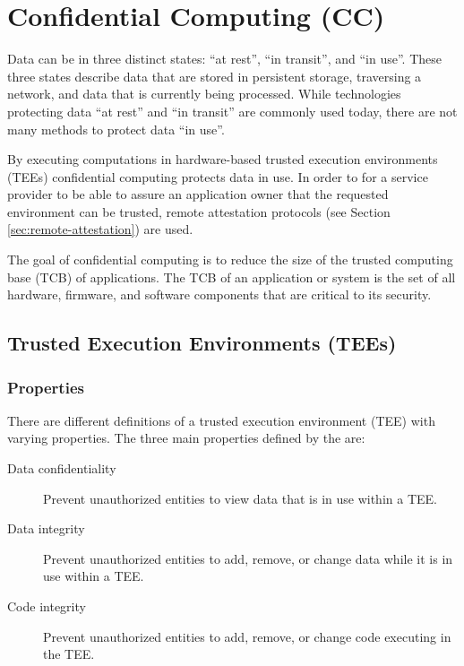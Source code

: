 \section{Confidential Computing (CC)}
\label{sec:confidential-computing}

Data can be in three distinct states: ``at rest'', ``in transit'', and ``in
use''. These three states describe data that are stored in persistent storage,
traversing a network, and data that is currently being processed. While
technologies protecting data ``at rest'' and ``in transit'' are commonly used
today, there are not many methods to protect data ``in use''.

By executing computations in hardware-based trusted execution environments
(TEEs) confidential computing protects data in use. In order to for a service
provider to be able to assure an application owner that the requested
environment can be trusted, remote attestation protocols (see Section
\ref{sec:remote-attestation}) are used.

The goal of confidential computing is to reduce the size of the trusted
computing base (TCB) of applications. The TCB of an application or system is the
set of all hardware, firmware, and software components that are critical to its
security.

\subsection{Trusted Execution Environments (TEEs)}
\label{sec:tee}

\subsubsection{Properties}

There are different definitions of a trusted execution environment (TEE) with
varying properties. The three main properties defined by the
\citeauthor{ccc2022technicalanalysis} \cite{ccc2022technicalanalysis} are:

\begin{description}
  \item[Data confidentiality]
    Prevent unauthorized entities to view data that is in use within a TEE.
  \item[Data integrity]
    Prevent unauthorized entities to add, remove, or change data while it is in
    use within a TEE.
  \item[Code integrity]
    Prevent unauthorized entities to add, remove, or change code executing in
    the TEE.
\end{description}


